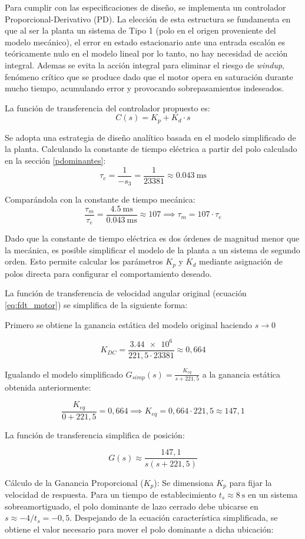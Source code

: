 Para cumplir con las especificaciones de diseño, se implementa un controlador Proporcional-Derivativo (PD). La elección de esta estructura se fundamenta en que al ser la planta un sistema de Tipo 1 (polo en el origen proveniente del modelo mecánico), el error en estado estacionario ante una entrada escalón es teóricamente nulo en el modelo lineal por lo tanto, no hay necesidad de acción integral. Ademas se evita la acción integral para eliminar el riesgo de \textit{windup}, fenómeno crítico que se produce dado que el motor opera en saturación durante mucho tiempo, acumulando error y provocando sobrepasamientos indeseados.

La función de transferencia del controlador propuesto es:
\[
	C(s) = K_p + K_d \cdot s
\]

Se adopta una estrategia de diseño analítico basada en el modelo simplificado de la planta. Calculando la constante de tiempo eléctrica a partir del polo calculado en la sección \ref{pdominantes}:
\[
\tau_e = \frac{1}{-s_3} = \frac{1}{23381} \approx \SI{0,043}{\milli\second}
\]

Comparándola con la constante de tiempo mecánica:
\[
\frac{\tau_m}{\tau_e} = \frac{\SI{4,5}{\milli\second}}{\SI{0.043}{\milli\second}} \approx 107 \implies \tau_m = 107 \cdot \tau_e
\]

Dado que la constante de tiempo eléctrica es dos órdenes de magnitud menor que la mecánica, es posible simplificar el modelo de la planta a un sistema de segundo orden. Esto permite calcular los parámetros $K_p$ y $K_d$ mediante asignación de polos directa para configurar el comportamiento deseado.

La función de transferencia de velocidad angular original (ecuación \ref{eq:fdt_motor}) se simplifica de la siguiente forma:

Primero se obtiene la ganancia estática del modelo original haciendo $s\rightarrow 0 $

\[
K_{DC} = \frac{\num{3,44e6}}{221,5\cdot23381} \approx 0,664
\]

Igualando el modelo simplificado $G_{simp}(s) = \frac{K_{eq}}{s + 221,5}$ a la ganancia estática obtenida anteriormente:

\[
\frac{K_{eq}}{0 + 221,5} = 0,664 \implies K_{eq} = 0,664 \cdot 221,5 \approx 147,1
\]

La función de transferencia simplifica de posición:

\[
G(s) \approx \frac{147,1}{s(s + 221,5)}
\]


Cálculo de la Ganancia Proporcional ($K_p$): Se dimensiona $K_p$ para fijar la velocidad de respuesta. Para un tiempo de establecimiento $t_s \approx \SI{8}{\second}$ en un sistema sobreamortiguado, el polo dominante de lazo cerrado debe ubicarse en $s \approx -4/t_s = -0,5$. Despejando de la ecuación característica simplificada, se obtiene el valor necesario para mover el polo dominante a dicha ubicación:

